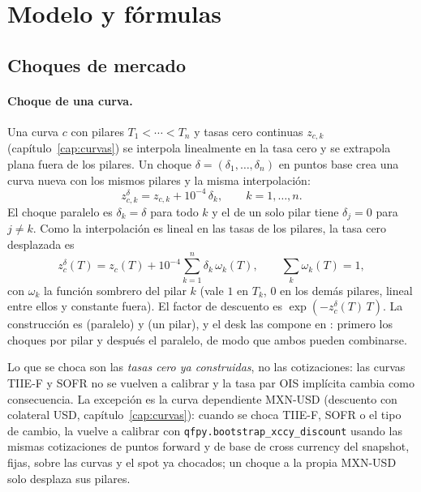 \section{Modelo y fórmulas}\label{sec:cap09-modelo}

\subsection{Choques de mercado}\label{sec:cap09-choques}

\paragraph{Choque de una curva.} Una curva $c$ con pilares $T_1<\cdots<T_n$ y tasas cero continuas $z_{c,k}$ (capítulo~\ref{cap:curvas}) se interpola linealmente en la tasa cero y se extrapola plana fuera de los pilares. Un choque $\delta=(\delta_1,\dots,\delta_n)$ en puntos base crea una curva nueva con los mismos pilares y la misma interpolación:
\begin{equation}\label{eq:cap09-choque-pilar}
  z^{\delta}_{c,k}=z_{c,k}+10^{-4}\,\delta_k,\qquad k=1,\dots,n .
\end{equation}
El choque paralelo es $\delta_k=\delta$ para todo $k$ y el de un solo pilar tiene $\delta_j=0$ para $j\ne k$. Como la interpolación es lineal en las tasas de los pilares, la tasa cero desplazada es
\begin{equation}\label{eq:cap09-sombrero}
  z^{\delta}_{c}(T)=z_{c}(T)+10^{-4}\sum_{k=1}^{n}\delta_k\,\omega_k(T),\qquad \sum_{k}\omega_k(T)=1,
\end{equation}
con $\omega_k$ la función sombrero del pilar $k$ (vale $1$ en $T_k$, $0$ en los demás pilares, lineal entre ellos y constante fuera). El factor de descuento es $\exp(-z^{\delta}_c(T)\,T)$. La construcción es
 (paralelo) y
 (un pilar), y el desk las compone en
: primero los choques por pilar y después el paralelo, de modo que ambos pueden combinarse.

Lo que se choca son las \emph{tasas cero ya construidas}, no las cotizaciones: las curvas TIIE-F y SOFR no se vuelven a calibrar y la tasa par OIS implícita cambia como consecuencia. La excepción es la curva dependiente MXN-USD (descuento \MXN{} con colateral USD, capítulo~\ref{cap:curvas}): cuando se choca TIIE-F, SOFR o el tipo de cambio,  la vuelve a calibrar con \texttt{qfpy.bootstrap\_xccy\_discount} usando las mismas cotizaciones de puntos forward y de base de cross currency del snapshot, fijas, sobre las curvas y el spot ya chocados; un choque a la propia MXN-USD solo desplaza sus pilares.

